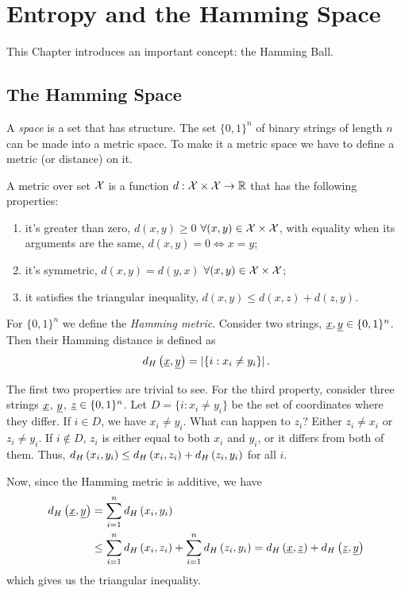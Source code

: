 
\chapter{Entropy and the Hamming Space}

This Chapter introduces an important concept: the Hamming Ball.

\section{The Hamming Space}

A \emph{space} is a set that has structure.
The set $\{0,1\}^{n}$ of binary strings of length $n$ can be made into a metric space.
To make it a metric space we have to define a metric (or distance) on it.

A metric over set $\mathcal{X}$ is a function $d: \mathcal{X} \times \mathcal{X} \to \mathbb{R}$ that has the following properties:
\begin{enumerate}
	\item it's greater than zero, \ie $d(x, y) \geq 0$ $\forall (x, y) \in \mathcal{X} \times \mathcal{X}$, with equality when its arguments are the same, \ie $d(x, y) = 0 \iff x = y$;
	\item it's symmetric, \ie $d(x, y) = d(y, x)$ $\forall (x, y) \in \mathcal{X} \times \mathcal{X}$;
	\item it satisfies the triangular inequality, \ie $d(x, y) \leq d(x, z) + d(z, y)$.
\end{enumerate}

For $\{0,1\}^{n}$ we define the \emph{Hamming metric}.
Consider two strings, $\underline{x}, \underline{y}  \in \{0, 1\}^n$.
Then their Hamming distance is defined as
\begin{equation}
	d_H \left({\underline{x}, \underline{y}}\right) = \left|{\{i : x_i \neq y_i\}}\right|.
\end{equation}

The first two properties are trivial to see.
For the third property, consider three strings $\underline{x}$, $\underline{y}$, $\underline{z} \in \{0,1\}^n$.
Let $D = \{i : x_i \neq y_i\}$ be the set of coordinates where they differ.
If $i \in D$, we have $x_{i} \neq y_{i}$.
What can happen to $z_{i}$?
Either $z_{i} \neq x_{i}$ or $z_{i} \neq y_{i}$.
If $i \not\in D$, $z_{i}$ is either equal to both $x_{i}$ and $y_{i}$, or it differs from both of them.
Thus, $d_H \left({x_{i},y_{i}}\right) \le d_H \left({x_{i},z_{i}}\right) + d_H \left({z_{i},y_{i}}\right)$ for all $i$.

Now, since the Hamming metric is additive, we have
\begin{align*}
	d_H \left({\underline{x},\underline{y}}\right) & =
	\sum_{i = 1}^n d_H \left({x_i,y_i}\right) \\
	& \le
	\sum_{i = 1}^n d_H \left({x_i,z_i}\right) +
	\sum_{i = 1}^n d_H \left({z_i,y_i}\right)
	=
	d_H \left({\underline{x},\underline{z}}\right) +
	d_H \left({\underline{z},\underline{y}}\right)
\end{align*}
which gives us the triangular inequality.


